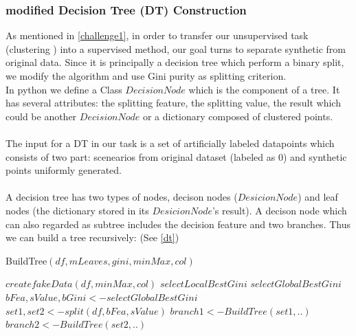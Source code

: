 \documentclass[conference]{IEEEtran}
\begin{document}
\subsubsection{modified Decision Tree (DT) Construction}
As mentioned in \autoref{challenge1}, in order to transfer our unsupervised task (clustering ) into a supervised method, our goal turns to separate synthetic from original data. 
Since it is principally a decision tree which perform a binary split, we modify the algorithm and use Gini purity as splitting criterion.\\
In python we define a Class $DecisionNode$ which is the component of a tree. It has several attributes: the splitting feature, the splitting value, the result which could be another $DecisionNode$ or a dictionary composed of clustered points.
\\\\The input for a DT in our task is a set of artificially labeled datapoints which consists of two part: scenearios from original dataset (labeled as 0) and synthetic points uniformly generated.
\\\\A decision tree has two types of nodes, decison nodes ($DesicionNode$) and leaf nodes (the dictionary stored in its $DesicionNode$'s result). A decison node which can also regarded as subtree includes the decision feature and two branches.
Thus we can build a tree recursively: (See \autoref{dt})
\begin{algorithm}[!h]
	\caption{BuildTree$(df,mLeaves,gini,minMax,col)$}
  \label{dt}
  \begin{algorithmic}[1]
      \STATE $createfakeData(df,minMax,col)$
       \STATE $selectLocalBestGini$
       \STATE $selectGlobalBestGini$
       \STATE $bFea,sValue,bGini <- selectGlobalBestGini$
         \STATE $set1,set2 <- split(df,bFea,sValue)$
         \STATE $branch1 <- BuildTree(set1,..)$
         \STATE $branch2 <- BuildTree(set2,..)$
        \ENDIF
      \ENDIF
    \ELSE
    \ENDIF
	\end{algorithmic}
\end{algorithm}
\end{document}
